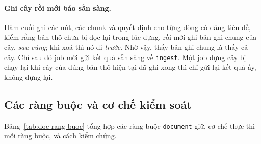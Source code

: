\paragraph{Ghi cây rồi mới báo sẵn sàng.} Hàm cuối ghi các nút, các chunk và quyết định cho từng
dòng có dáng tiêu đề, kiểm rằng bản thô chưa bị đọc lại trong lúc dựng, rồi mới ghi bản ghi chung
của cây, \emph{sau cùng}; khi xoá thì nó đi \emph{trước}. Nhờ vậy, thấy bản ghi chung là thấy cả
cây. Chỉ sau đó job mới gửi kết quả sẵn sàng về \texttt{ingest}. Một job dựng cây bị chạy lại khi
cây của đúng bản thô hiện tại đã ghi xong thì chỉ gửi lại kết quả ấy, không dựng lại.

\subsection{Các ràng buộc và cơ chế kiểm soát}

Bảng~\ref{tab:doc-rang-buoc} tổng hợp các ràng buộc \texttt{document} giữ, cơ chế thực thi mỗi ràng
buộc, và cách kiểm chứng.

